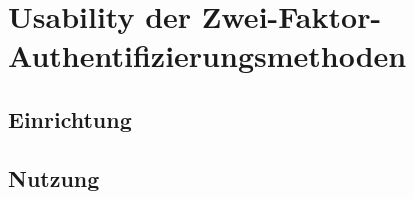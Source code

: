 \chapter{Usability der Zwei-Faktor-Authentifizierungsmethoden}
\section{Einrichtung}
\section{Nutzung}

